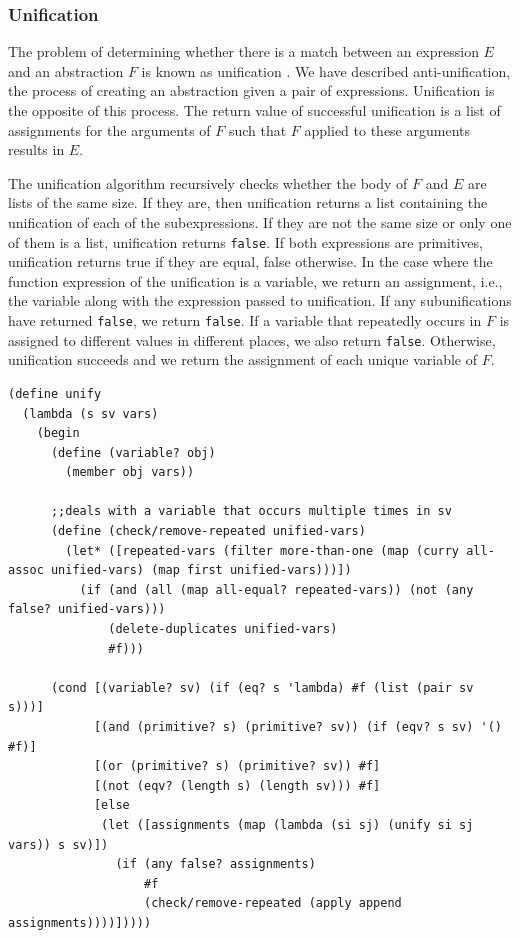 \documentclass[a4paper,10pt]{article}
\begin{document}


\subsubsection{Unification}

The problem of determining whether there is a match between an expression $E$ and an abstraction $F$ is known as unification \cite{Robinson:1965:MLB:321250.321253}. We have described anti-unification, the process of creating an abstraction given a pair of expressions. Unification is the opposite of this process.  The return value of successful unification is a list of assignments for the arguments of $F$ such that $F$ applied to these arguments results in $E$.

The unification algorithm recursively checks whether the body of $F$ and $E$ are lists of the same size.  If they are, then unification returns a list containing the unification of each of the subexpressions.  If they are not the same size or only one of them is a list, unification returns \texttt{false}.  If both expressions are primitives, unification returns true if they are equal, false otherwise.  In the case where the function expression of the unification is a variable, we return an assignment, i.e., the variable along with the expression passed to unification. If any subunifications have returned \texttt{false}, we return \texttt{false}. If a variable that repeatedly occurs in $F$ is assigned to different values in different places, we also return \texttt{false}.
Otherwise, unification succeeds and we return the assignment of each unique variable of $F$.

\begin{lstlisting}[frame=trbl]
(define unify
  (lambda (s sv vars)
    (begin
      (define (variable? obj)
        (member obj vars))

      ;;deals with a variable that occurs multiple times in sv
      (define (check/remove-repeated unified-vars)
        (let* ([repeated-vars (filter more-than-one (map (curry all-assoc unified-vars) (map first unified-vars)))])
          (if (and (all (map all-equal? repeated-vars)) (not (any false? unified-vars)))
              (delete-duplicates unified-vars)
              #f)))
      
      (cond [(variable? sv) (if (eq? s 'lambda) #f (list (pair sv s)))]
            [(and (primitive? s) (primitive? sv)) (if (eqv? s sv) '() #f)]
            [(or (primitive? s) (primitive? sv)) #f]
            [(not (eqv? (length s) (length sv))) #f]
            [else
             (let ([assignments (map (lambda (si sj) (unify si sj vars)) s sv)])
               (if (any false? assignments)
                   #f
                   (check/remove-repeated (apply append assignments))))]))))
\end{lstlisting}
\end{document}
